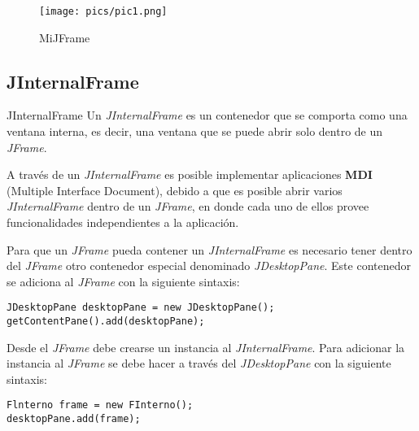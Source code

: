 \documentclass[11pt]{beamer}
\begin{document}
\begin{frame}

\begin{center}
\begin{figure}
\texttt{[image: pics/pic1.png]}
\caption{MiJFrame} 
\end{figure}
\end{center}
\end{frame}
\subsection{JInternalFrame}
\begin{frame}{JInternalFrame}
Un \textit{JInternalFrame} es un contenedor que se comporta como una ventana interna, es decir, una ventana que se puede abrir solo dentro de un \textit{JFrame}.
\end{frame}

\begin{frame}
A través de un \textit{JInternalFrame} es posible implementar aplicaciones \textbf{MDI} (Multiple Interface Document), debido a que es posible abrir varios \textit{JInternalFrame} dentro de un \textit{JFrame}, en donde cada uno de ellos provee funcionalidades independientes a la aplicación.
\end{frame}
 
\begin{frame}[fragile]

Para que un \textit{JFrame} pueda contener un \textit{JInternalFrame} es necesario tener dentro del \textit{JFrame} otro contenedor especial denominado \textit{JDesktopPane}. Este contenedor se adiciona al \textit{JFrame} con la siguiente sintaxis:


\begin{lstlisting}
JDesktopPane desktopPane = new JDesktopPane();
getContentPane().add(desktopPane);

\end{lstlisting}

\end{frame}

\begin{frame}[fragile]
Desde el \textit{JFrame} debe crearse un instancia al \textit{JInternalFrame}. Para adicionar la instancia al \textit{JFrame} se debe hacer a través del \textit{JDesktopPane} con la siguiente sintaxis:


\begin{lstlisting}
Flnterno frame = new FInterno();
desktopPane.add(frame);
\end{lstlisting}
\end{frame}
\end{document}
